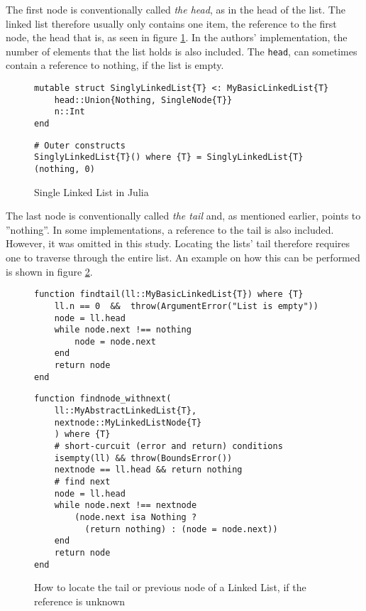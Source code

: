 \documentclass[a4paper, 11pt]{article}
\begin{document}
    The first node is conventionally called \emph{the head}, as in the head of the list. 
    The linked list therefore usually only contains one item, the reference to the first node, the 
    head that is, as seen in figure \ref{code:SingleList}. In the authors' implementation, 
    the number of elements that the list holds is also included. 
    The \texttt{head}, can
    sometimes contain a reference to nothing, if the list is empty. 
    \begin{figure}[H]
        \centering
    \begin{verbatim}
mutable struct SinglyLinkedList{T} <: MyBasicLinkedList{T}
    head::Union{Nothing, SingleNode{T}}
    n::Int
end
    \end{verbatim}
    \begin{verbatim}
# Outer constructs
SinglyLinkedList{T}() where {T} = SinglyLinkedList{T}(nothing, 0)
    \end{verbatim}
    \caption{Single Linked List in Julia}
    \label{code:SingleList}
    \end{figure}

    The last node is conventionally called \emph{the tail} and, as mentioned earlier, 
    points to ''nothing''. In some implementations, a reference to the tail is also included. 
    However, it was omitted in this study.
    Locating the lists' tail therefore requires one to traverse through the entire list.
    An example on how this can be performed is shown in figure \ref{code:findtail}. 
    \begin{figure}[H]
    \centering
    \begin{verbatim}
function findtail(ll::MyBasicLinkedList{T}) where {T}
    ll.n == 0  &&  throw(ArgumentError("List is empty"))
    node = ll.head
    while node.next !== nothing
        node = node.next
    end
    return node
end
    \end{verbatim}
    \begin{verbatim}
function findnode_withnext(
    ll::MyAbstractLinkedList{T}, 
    nextnode::MyLinkedListNode{T}
    ) where {T}
    # short-curcuit (error and return) conditions
    isempty(ll) && throw(BoundsError()) 
    nextnode == ll.head && return nothing
    # find next
    node = ll.head 
    while node.next !== nextnode
        (node.next isa Nothing ? 
          (return nothing) : (node = node.next))
    end
    return node
end
    \end{verbatim}
    \caption{How to locate the tail or previous node of a Linked List, 
    if the reference is unknown}
    \label{code:findtail}
    \end{figure}
\end{document}
